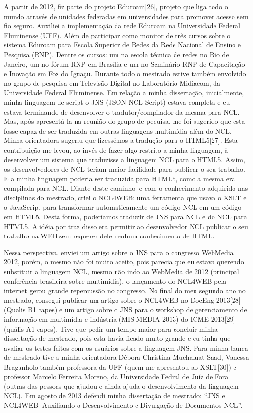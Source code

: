 \documentclass[10pt,a4paper,oneside]{book}
\begin{document}
A partir de 2012, fiz parte do projeto Eduroam[26], projeto que liga todo o mundo através de unidades federadas em universidades para promover acesso sem fio seguro. Auxiliei a implementação da rede Eduroam na Universidade Federal Fluminense (UFF). Além de participar como monitor de três cursos sobre o sistema Eduroam para Escola Superior de Redes da Rede Nacional de Ensino e Pesquisa (RNP). Dentre os cursos: um na escola técnica de redes no Rio de Janeiro, um no fórum RNP em Brasília e um no Seminário RNP de Capacitação e Inovação em Foz do Iguaçu.
Durante todo o mestrado estive também envolvido no grupo de pesquisa em Televisão Digital no Laboratório Midiacom, da Universidade Federal Fluminense.  Em relação a minha dissertação, inicialmente, minha linguagem de script o JNS (JSON NCL Script) estava completa e eu estava terminando de desenvolver o tradutor/compilador da mesma para NCL. Mas, após apresentá-la na reunião do grupo de pequisa, me foi sugerido que esta fosse capaz de ser traduzida em outras linguagens multimídia além do NCL. Minha orientadora sugeriu que fizessémos a tradução para o HTML5[27]. Esta contribuição me levou, ao invés de fazer algo restrito a minha linguagem, à desenvolver um sistema que traduzisse a linguagem NCL para o HTML5. Assim, os desenvolvedores de NCL teriam maior facilidade para publicar o seu trabalho. E a minha linguagem poderia ser traduzida para HTML5, como a mesma era compilada para NCL.
Diante deste caminho, e com o conhecimento adquirido nas disciplinas do mestrado, criei o NCL4WEB:  uma ferramenta que usava o XSLT e o JavaScript para transformar automaticamente um código NCL em um código em HTML5. Desta forma, poderíamos traduzir de JNS para NCL e do NCL para HTML5. A idéia por traz disso era permitir ao desenvolvedor NCL publicar o seu trabalho na WEB sem requerer dele nenhum conhecimento de HTML.

Nessa perspectiva, enviei um artigo sobre o JNS para o congresso WebMedia 2012, porém, o mesmo não foi muito aceito, pois parecia que eu estava querendo substituir a linguagem NCL, mesmo não indo ao WebMedia de 2012 (principal conferência brasileira sobre multimídia), o lançamento do NCL4WEB pela internet gerou grande repercussão no congresso.
No final do meu segundo ano no mestrado, consegui publicar um artigo sobre o NCL4WEB no DocEng 2013[28] (Qualis B1 capes) e um artigo sobre o JNS para o workshop de gerenciamento  de informação em multimídia e indústria (MIS-MEDIA 2013) do ICME 2013[29] (quális A1 capes). Tive que pedir um tempo maior para concluir minha dissertação de mestrado, pois esta havia ficado muito grande e eu tinha que avaliar os testes feitos com os usuários sobre a linguagem JNS.
Para minha banca de mestrado tive a minha orientadora Débora Christina Muchaluat Saad, Vanessa Braganholo também professora da UFF (quem me apresentou ao XSLT[30]) e professor Marcelo Ferreira Moreno, da Universidade Fedral de Juíz de Fora (outras das pessoas que ajudou e ainda ajuda o desenvolvimento da linguagem NCL). Em agosto de 2013 defendi minha dissertação de mestrado: “JNS e NCL4WEB: Auxiliando o Desenvolvimento e Divulgação de Documentos NCL”.
\end{document}
